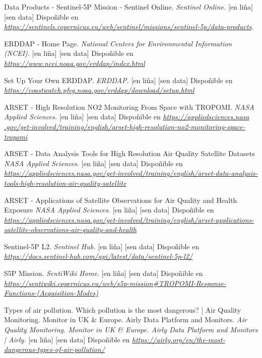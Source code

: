 

\begin{thebibliography}{99}
     Data Products - Sentinel-5P Mission - Sentinel Online. \textit{Sentinel Online.} [en liña] [sen data] Dispoñible en \textit{\url{ https://sentinels.copernicus.eu/web/sentinel/missions/sentinel-5p/data-products}}.

     ERDDAP - Home Page. \textit{National Centers for Environmental Information (NCEI).} [en liña] [sen data] Dispoñible en \textit{\url{ https://www.ncei.noaa.gov/erddap/index.html}}

     Set Up Your Own ERDDAP. \textit{ERDDAP.} [en liña] [sen data] Dispoñible en \textit{\url{ https://coastwatch.pfeg.noaa.gov/erddap/download/setup.html}}

     ARSET - High Resolution NO2 Monitoring From Space with TROPOMI. \textit{NASA Applied Sciences.} [en liña] [sen data] Dispoñible en \textit{\url{ https://appliedsciences.nasa
.gov/get-involved/training/english/arset-high-resolution-no2-monitoring-space-tropomi}}

     ARSET - Data Analysis Tools for High Resolution Air Quality Satellite Datasets \textit{NASA Applied Sciences.} [en liña] [sen data] Dispoñible en \textit{\url{https://appliedsciences.nasa.gov/get-involved/training/english/arset-data-analysis-tools-high-resolution-air-quality-satellite}}

     ARSET - Applications of Satellite Observations for Air Quality and Health Exposure \textit{NASA Applied Sciences.} [en liña] [sen data] Dispoñible en \textit{\url{https://appliedsciences.nasa.gov/get-involved/training/english/arset-applications-satellite-observations-air-quality-and-health}}

     Sentinel-5P L2. \textit{Sentinel Hub.} [en liña] [sen data] Dispoñible en \textit{\url{ https://docs.sentinel-hub.com/api/latest/data/sentinel-5p-l2/}}

     S5P Mission. \textit{SentiWiki Home.} [en liña] [sen data] Dispoñible en \textit{\url{https://sentiwiki.copernicus.eu/web/s5p-mission\#TROPOMI-Response-Functions-(Acquisition-Modes)}}

     Types of air pollution. Which pollution is the most dangerous? | Air Quality Monitoring. Monitor in UK \& Europe. Airly Data Platform and Monitors. \textit{Air Quality
    Monitoring. Monitor in UK \& Europe. Airly Data Platform and Monitors | Airly.} [en liña] [sen data] Dispoñible en \textit{\url{https://airly.org/en/the-most-dangerous-types-of-air-pollution/}}


\end{thebibliography}
